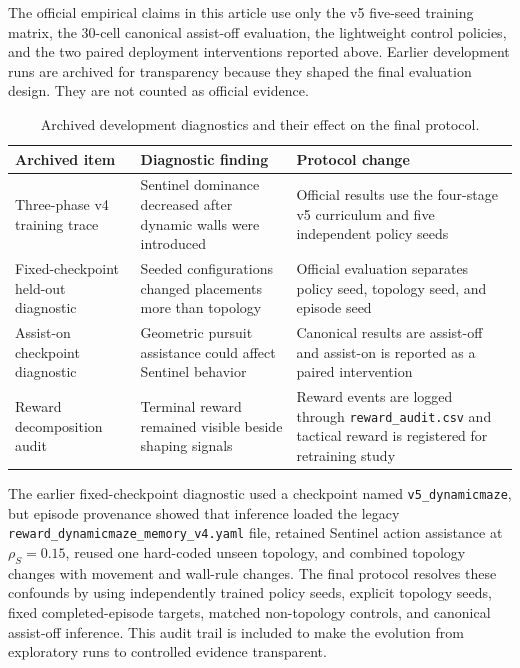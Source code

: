 \documentclass[journal]{IEEEtran}
\begin{document}
The official empirical claims in this article use only the v5 five-seed
training matrix, the 30-cell canonical assist-off evaluation, the lightweight
control policies, and the two paired deployment interventions reported above.
Earlier development runs are archived for transparency because they shaped the
final evaluation design. They are not counted as official evidence.

\begin{table}[H]
\centering
\caption{Archived development diagnostics and their effect on the final protocol.}
\label{tab:development_diagnostics}
\scriptsize
\setlength{\tabcolsep}{3pt}
\begin{tabular}{p{2.05cm}p{2.25cm}p{2.45cm}}
\toprule
Archived item & Diagnostic finding & Protocol change \\
\midrule
Three-phase v4 training trace & Sentinel dominance decreased after dynamic walls were introduced & Official results use the four-stage v5 curriculum and five independent policy seeds \\
Fixed-checkpoint held-out diagnostic & Seeded configurations changed placements more than topology & Official evaluation separates policy seed, topology seed, and episode seed \\
Assist-on checkpoint diagnostic & Geometric pursuit assistance could affect Sentinel behavior & Canonical results are assist-off and assist-on is reported as a paired intervention \\
Reward decomposition audit & Terminal reward remained visible beside shaping signals & Reward events are logged through \texttt{reward\_audit.csv} and tactical reward is registered for retraining study \\
\bottomrule
\end{tabular}
\end{table}

The earlier fixed-checkpoint diagnostic used a checkpoint named
\texttt{v5\_dynamicmaze}, but episode provenance showed that inference loaded
the legacy \texttt{reward\_dynamicmaze\_memory\_v4.yaml} file, retained Sentinel
action assistance at $\rho_S=0.15$, reused one hard-coded unseen topology, and
combined topology changes with movement and wall-rule changes. The final
protocol resolves these confounds by using independently trained policy seeds,
explicit topology seeds, fixed completed-episode targets, matched non-topology
controls, and canonical assist-off inference. This audit trail is included to
make the evolution from exploratory runs to controlled evidence transparent.
\end{document}
